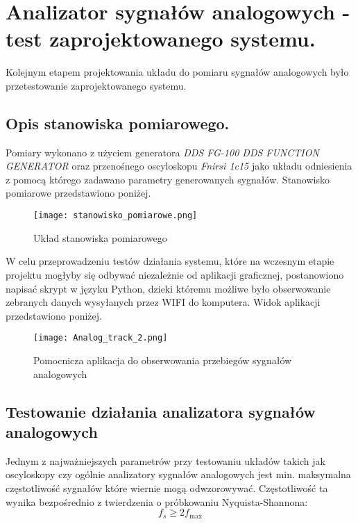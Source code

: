 \section{Analizator sygnałów analogowych - test zaprojektowanego systemu.}
    Kolejnym etapem projektowania układu do pomiaru sygnałów analogowych było przetestowanie 
    zaprojektowanego systemu.

\subsection{Opis stanowiska pomiarowego.}
    Pomiary wykonano z użyciem generatora \textit{DDS FG-100 DDS FUNCTION GENERATOR}
    oraz przenośnego oscyloskopu \textit{Fnirsi 1c15} jako układu odniesienia z pomocą którego
    zadawano parametry generowanych sygnałów. Stanowisko pomiarowe przedstawiono poniżej.

    \begin{figure}[!ht]
        \centering
        \texttt{[image: stanowisko\_pomiarowe.png]}
        \caption{Układ stanowiska pomiarowego}
        \label{fig:stanowisko_pomiarowe}
    \end{figure} 

    W celu przeprowadzeniu testów działania systemu, które na wczesnym etapie projektu
    mogłyby się odbywać niezależnie od aplikacji graficznej, postanowiono napisać
    skrypt w języku Python, dzieki któremu możliwe było obserwowanie zebranych danych
    wysyłanych przez WIFI do komputera. Widok aplikacji przedstawiono poniżej.
    
    \begin{figure}[H]
        \centering
        \texttt{[image: Analog\_track\_2.png]}
        \caption{Pomocnicza aplikacja do obserwowania przebiegów sygnałów analogowych}
        \label{fig:Analog_track_2}
    \end{figure}

\subsection{Testowanie działania analizatora sygnałów analogowych}
    Jednym z najważniejszych parametrów przy testowaniu układów takich jak oscyloskopy
    czy ogólnie analizatory sygnałów analogowych jest min. maksymalna częstotliwość
    sygnałów które wiernie mogą odwzorowywać. Częstotliwość ta wynika bezpośrednio z 
    twierdzenia o próbkowaniu Nyquista-Shannona:
    \[
    f_s \geq 2 f_{\max}
    \]

